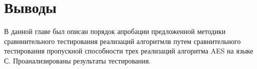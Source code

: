 \section{Выводы} \label{ch4:conclusion}

В данной главе был описан порядок апробации предложенной методики сравннительного тестирования реализаций алгоритмлв путем сравнительного тестирования пропускной способности трех реализаций алгоритма AES на языке С. Проанализированы результаты тестирования.

\newpage

%
